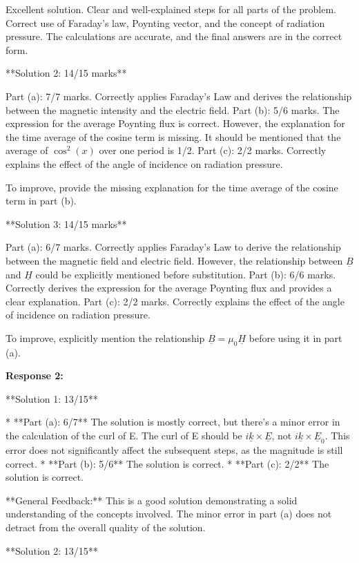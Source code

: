 \documentclass[a4paper,11pt]{article}
\begin{document}
Excellent solution. Clear and well-explained steps for all parts of the problem. Correct use of Faraday's law, Poynting vector, and the concept of radiation pressure. The calculations are accurate, and the final answers are in the correct form.

**Solution 2: 14/15 marks**

Part (a): 7/7 marks. Correctly applies Faraday's Law and derives the relationship between the magnetic intensity and the electric field.
Part (b): 5/6 marks. The expression for the average Poynting flux is correct. However, the explanation for the time average of the cosine term is missing. It should be mentioned that the average of \( \cos^2(x) \) over one period is 1/2.
Part (c): 2/2 marks. Correctly explains the effect of the angle of incidence on radiation pressure.

To improve, provide the missing explanation for the time average of the cosine term in part (b).

**Solution 3: 14/15 marks**

Part (a): 6/7 marks. Correctly applies Faraday's Law to derive the relationship between the magnetic field and electric field. However, the relationship between \( \underline{B} \) and \( \underline{H} \) could be explicitly mentioned before substitution.
Part (b): 6/6 marks. Correctly derives the expression for the average Poynting flux and provides a clear explanation.
Part (c): 2/2 marks. Correctly explains the effect of the angle of incidence on radiation pressure.

To improve, explicitly mention the relationship \( \underline{B} = \mu_0 \underline{H} \) before using it in part (a).


\textbf{Response 2:}

**Solution 1: 13/15**

*   **Part (a): 6/7** The solution is mostly correct, but there's a minor error in the calculation of the curl of E. The curl of E should be \(i\underline{k} \times \underline{E}\), not \(i\underline{k} \times \underline{E}_0\). This error does not significantly affect the subsequent steps, as the magnitude is still correct.
*   **Part (b): 5/6** The solution is correct.
*   **Part (c): 2/2** The solution is correct.

**General Feedback:** This is a good solution demonstrating a solid understanding of the concepts involved. The minor error in part (a) does not detract from the overall quality of the solution.

**Solution 2: 13/15**
\end{document}
